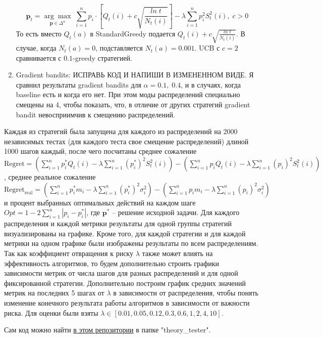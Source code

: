 \documentclass{article}
\begin{document}
\begin{enumerate}
    $$\textbf{p}_t = \underset{\textbf{p} \in \Delta^n}{\arg \max} \; \sum_{i=1}^n p_i \cdot \left[ Q_t(i) + c \sqrt{\frac{ln \; t}{N_t(i)}} \right] - \lambda \sum_{i=1}^n p_i^2 S_t^2(i) ,\; c > 0$$
    То есть вместо $Q_t(a)$ в StandardGreedy подается $Q_t(i) + c \sqrt{\frac{ln \; t}{N_t(i)}}$. В случае, когда $N_t(a) = 0$, подставляется $N_t(a) = 0.001$. UCB с $c = 2$ сравнивается с $0.1$-greedy стратегией.
    \item Gradient bandits: ИСПРАВЬ КОД И НАПИШИ В ИЗМЕНЕННОМ ВИДЕ.
    Я сравнил результаты gradient bandits для $\alpha = 0.1, \; 0.4$, и в случаях, когда baseline есть и когда его нет. При этом моды распределений специально смещены на 4, чтобы показать, что, в отличие от других стратегий gradient bandit невосприимчив к смещению распределений.
\end{enumerate}

Каждая из стратегий была запущена для каждого из распределений на 2000 независимых тестах (для каждого теста свое смещение распределений) длиной 1000 шагов каждый, после чего посчитаны среднее сожаление $\text{Regret} = \left( \sum_{i=1}^n p_i^* Q_t(i) - \lambda \sum_{i=1}^n (p_i^*)^2 S_t^2(i) \right) - \left( \sum_{i=1}^n p_i Q_t(i) - \lambda \sum_{i=1}^n (p_i)^2 S_t^2(i) \right)$, среднее реальное сожаление $\text{Regret}_{\text{real}} = \left( \sum_{i=1}^n p_i^* m_i - \lambda \sum_{i=1}^n (p_i^*)^2 \sigma_i^2 \right) - \left( \sum_{i=1}^n p_i m_i - \lambda \sum_{i=1}^n (p_i)^2 \sigma_i^2 \right)$ и процент выбранных оптимальных действий на каждом шаге $Opt = 1 - 2 \sum_{i=1}^n |p_i - p_i^*|$, где $\textbf{p}^*$ -- решение исходной задачи. Для каждого распределения и каждой метрики результаты для одной группы стратегий визуализированы на графике. Кроме того, для каждой стратегии и для каждой метрики на одном графике были изображены результаты по всем распределениям. \\
Так как коэффициент отвращения к риску $\lambda$ также может влиять на эффективность алгоритмов, то будем дополнительно строить графики зависимости метрик от числа шагов для разных распределений и для одной фиксированной стратегии. Дополнительно построим график средних значений метрик на последних 5 шагах от $\lambda$ в зависимости от распределения, чтобы понять изменение конечного результата работы алгоритмов в зависимости от важности риска. Для оценки были взяты $\lambda \in [0.01, 0.05, 0.12, 0.3, 0.6, 1, 2, 4, 10]$.


 Сам код можно найти \href{https://github.com/davynchi/diploma/blob/main}{в этом репозитории} в папке "theory\_tester".
\end{document}
